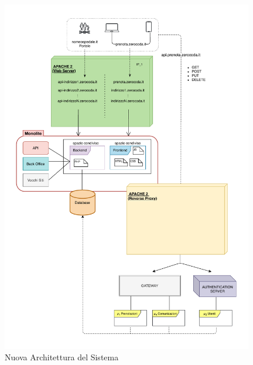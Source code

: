 \documentclass[a4paper,11pt]{article}
\begin{document}
	\begin{figure}
		\centering
		\includegraphics[width=0.98\textwidth]{images/01_new_architecture.pdf}
		\caption{Nuova Architettura del Sistema}
		\label{fig:new_arcchitecture_abstract}
	\end{figure}
\end{document}

